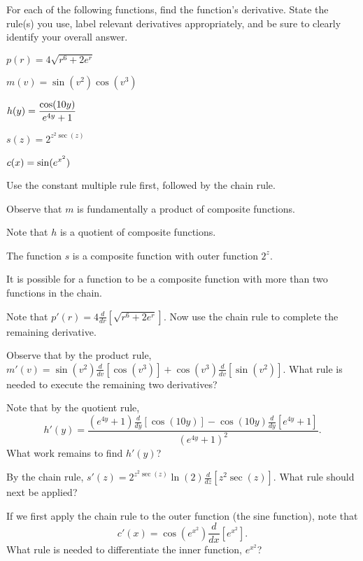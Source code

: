 \begin{activity} \label{A:2.5.2}  
For each of the following functions, find the function's derivative.  State the rule(s) you use, label relevant derivatives appropriately, and be sure to clearly identify your overall answer. 
\bmtwo 
\ba
	\item $p(r) = 4\sqrt{r^6 + 2e^r}$
	\item $m(v) = \sin(v^2) \cos(v^3)$
	\item $\displaystyle h(y) = \frac{\cos(10y)}{e^{4y}+1}$
	\item $s(z) = 2^{z^2 \sec (z)}$
	\item $\displaystyle c(x) = \sin(e^{x^2})$
\ea
\emtwo
\end{activity}
\begin{smallhint}
\ba
	\item Use the constant multiple rule first, followed by the chain rule.
	\item Observe that $m$ is fundamentally a product of composite functions.
	\item Note that $h$ is a quotient of composite functions.
	\item The function $s$ is a composite function with outer function $2^z$.
	\item It is possible for a function to be a composite function with more than two functions in the chain.
\ea
\end{smallhint}
\begin{bighint}
\ba
	\item Note that $p'(r) = 4\frac{d}{dr}[\sqrt{r^6 + 2e^r}].$  Now use the chain rule to complete the remaining derivative.
	\item Observe that by the product rule, $m'(v) = \sin(v^2) \frac{d}{dv}[\cos(v^3)] + \cos(v^3) \frac{d}{dv}[\sin(v^2)].$  What rule is needed to execute the remaining two derivatives?
	\item Note that by the quotient rule,
	$$h'(y) = \frac{(e^{4y}+1) \frac{d}{dy}[\cos(10y)] - \cos(10y) \frac{d}{dy}[e^{4y}+1]}{(e^{4y}+1)^2}.$$
	What work remains to find $h'(y)$?
	\item By the chain rule, $s'(z) = 2^{z^2\sec(z)} \ln(2) \frac{d}{dz}[z^2 \sec(z)]$.  What rule should next be applied?
	\item If we first apply the chain rule to the outer function (the sine function), note that 
	$$c'(x) = \cos(e^{x^2}) \frac{d}{dx}[e^{x^2}].$$
	What rule is needed to differentiate the inner function, $e^{x^2}$?
\ea
\end{bighint}
